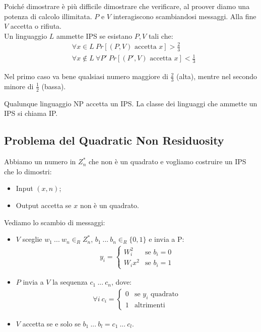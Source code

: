 \noindent Poiché dimostrare è più difficile dimostrare che verificare, al proover diamo una potenza di calcolo illimitata. $P$ e $V$ interagiscono scambiandosi messaggi. Alla fine $V$ accetta o rifiuta. 
\\

\noindent Un linguaggio $L$ ammette IPS se esistano $P, V$ tali che:
\begin{align*}
    &\forall x \in L \ Pr[(P, V) \text{ accetta } x] > \frac{2}{3}\\
    &\forall x \not\in L \ \forall P' \ Pr[(P', V) \text{ accetta } x] < \frac{1}{3}
\end{align*}

\noindent Nel primo caso va bene qualsiasi numero maggiore di $\frac{2}{3}$ (alta), mentre nel secondo minore di $\frac{1}{2}$ (bassa).

Qualunque linguaggio NP accetta un IPS. La classe dei linguaggi che ammette un IPS si chiama IP.

\subsection{Problema del Quadratic Non Residuosity}
Abbiamo un numero in $Z_n^*$ che non è un quadrato e vogliamo costruire un IPS che lo dimostri:
\begin{itemize}
    \item Input $(x, n)$;
    \item Output accetta se $x$ non è un quadrato.
\end{itemize}

\noindent Vediamo lo scambio di messaggi:
\begin{itemize}
    \item $V$ sceglie $w_1 \ ... \ w_n \in_R Z_n^*$, $b_1 \ ... \ b_n \in_R \{0, 1\}$ e invia a P: 
    \begin{align*}
        y_i = 
        \begin{cases} 
            W_i^2& \mbox{se }b_i = 0 \\ 
            W_ix^2& \mbox{se } b_i = 1
        \end{cases} 
    \end{align*}
    \item $P$ invia a $V$ la sequenza $c_1 \ ... \ c_n$, dove:
    \begin{align*}
        \forall i \ c_i =
        \begin{cases} 
            0& \mbox{se } y_i \text{ quadrato} \\ 
            1& \mbox{altrimenti }
        \end{cases}
    \end{align*}
    \item $V$ accetta se e solo se $b_1 \ ... \ b_l = c_1 \ ... \ c_l$.
\end{itemize}

